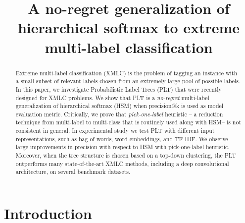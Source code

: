 \documentclass{article}
\title{A no-regret generalization of hierarchical softmax to extreme multi-label classification}
\newcommand{\Algo}[1]{\textsc{#1}}
\begin{document}
\maketitle




\begin{abstract}
Extreme multi-label classification (XMLC) is the problem of tagging an instance with a small subset of relevant labels chosen from an extremely large pool of possible labels. In this paper, we investigate Probabilistic Label Trees (PLT) that were recently designed for XMLC problems. 
We show that \Algo{PLT} is a \emph{no-regret} multi-label generalization of hierarchical softmax (\Algo{HSM}) when precision@k is used as model evaluation metric. 
Critically, we prove that \emph{pick-one-label} heuristic -- a reduction technique from multi-label to multi-class that is routinely used along with HSM-- is not consistent in general. 
In experimental study we test PLT with different input representations, such as bag-of-words, word embeddings, and TF-IDF.
We observe large improvements in precision with respect to \Algo{HSM} with pick-one-label heuristic. 
Moreover, when the tree structure is chosen based on a top-down clustering, the PLT outperforms many state-of-the-art XMLC methods, including a deep convolutional architecture, on several benchmark datasets.
%
\end{abstract}

\section{Introduction}
\label{sec:introduction}
\end{document}
